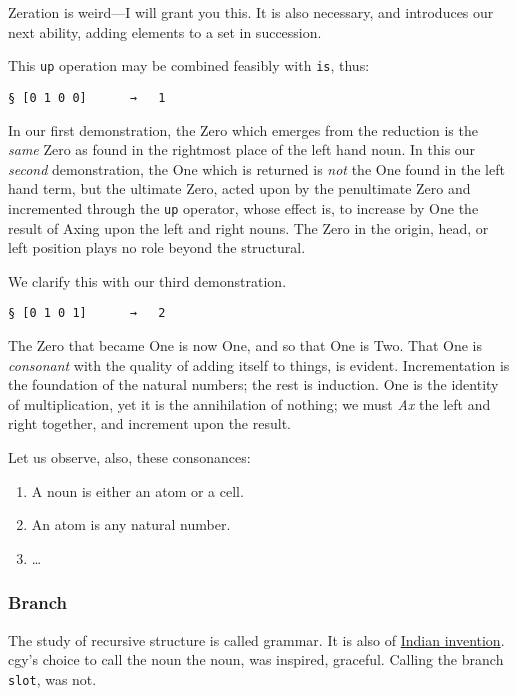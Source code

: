\documentclass[twoside]{article}
\begin{document}
Zeration is weird---I will grant you this. It is also necessary, and introduces our next ability, adding elements to a set in succession.

This \texttt{up} operation may be combined feasibly with \texttt{is}, thus:

\begin{lstlisting}[style=listingcode]
§ [0 1 0 0]      →   1
\end{lstlisting}

In our first demonstration, the Zero which emerges from the reduction is the \emph{same} Zero as found in the rightmost place of the left hand noun. In this our \emph{second} demonstration, the One which is returned is \emph{not} the One found in the left hand term, but the ultimate Zero, acted upon by the penultimate Zero and incremented through the \texttt{up} operator, whose effect is, to increase by One the result of Axing upon the left and right nouns. The Zero in the origin, head, or left position plays no role beyond the structural.

We clarify this with our third demonstration.

\begin{lstlisting}[style=listingcode]
§ [0 1 0 1]      →   2
\end{lstlisting}

\noindent
The Zero that became One is now One, and so that One is Two.  That One is \emph{consonant} with the quality of adding itself to things, is evident. Incrementation is the foundation of the natural numbers; the rest is induction. One is the identity of multiplication, yet it is the annihilation of nothing; we must \emph{Ax} the left and right together, and increment upon the result.

Let us observe, also, these consonances:

\begin{enumerate}
  \setcounter{enumi}{0}
  \item A noun is either an atom or a cell.
  \item An atom is any natural number.
  \item \ldots{}
\end{enumerate}

\subsubsection{Branch}

The study of recursive structure is called grammar. It is also of \href{https://en.wikipedia.org/wiki/P%C4%81%E1%B9%87ini}{Indian invention}. cgy's choice to call the noun the noun, was inspired, graceful. Calling the branch \texttt{slot}, was not.
\end{document}

